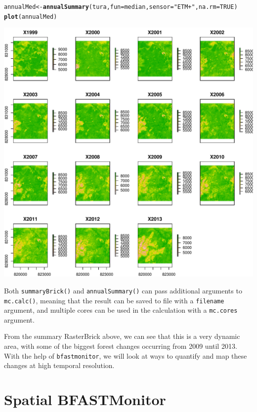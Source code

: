 \documentclass{article}\usepackage[]{graphicx}\usepackage[]{color}
\makeatletter
\def\maxwidth{ %
  \ifdim\Gin@nat@width>\linewidth
    \linewidth
  \else
    \Gin@nat@width
  \fi
}
\newcommand{\hlnum}[1]{\textcolor[rgb]{0.686,0.059,0.569}{#1}}%
\newcommand{\hlstr}[1]{\textcolor[rgb]{0.192,0.494,0.8}{#1}}%
\newcommand{\hlstd}[1]{\textcolor[rgb]{0.345,0.345,0.345}{#1}}%
\newcommand{\hlkwb}[1]{\textcolor[rgb]{0.69,0.353,0.396}{#1}}%
\newcommand{\hlkwc}[1]{\textcolor[rgb]{0.333,0.667,0.333}{#1}}%
\newcommand{\hlkwd}[1]{\textcolor[rgb]{0.737,0.353,0.396}{\textbf{#1}}}%
\newenvironment{kframe}{%
 \def\at@end@of@kframe{}%
 \ifinner\ifhmode%
  \def\at@end@of@kframe{\end{minipage}}%
  \begin{minipage}{\columnwidth}%
 \fi\fi%
 \def\FrameCommand##1{\hskip\@totalleftmargin \hskip-\fboxsep
 \colorbox{shadecolor}{##1}\hskip-\fboxsep
     \hskip-\linewidth \hskip-\@totalleftmargin \hskip\columnwidth}%
 \MakeFramed {\advance\hsize-\width
   \@totalleftmargin\z@ \linewidth\hsize
   \@setminipage}}%
 {\par\unskip\endMakeFramed%
 \at@end@of@kframe}
\newenvironment{knitrout}{}{} %
\def\code#1{\texttt{#1}}
\makeatother
\begin{document}
\begin{knitrout}
\color{fgcolor}\begin{kframe}
\begin{alltt}
\hlstd{annualMed} \hlkwb{<-} \hlkwd{annualSummary}\hlstd{(tura,} \hlkwc{fun} \hlstd{= median,} \hlkwc{sensor} \hlstd{=} \hlstr{"ETM+"}\hlstd{,} \hlkwc{na.rm} \hlstd{=} \hlnum{TRUE}\hlstd{)}
\hlkwd{plot}\hlstd{(annualMed)}
\end{alltt}
\end{kframe}
\includegraphics[width=\maxwidth]{figure/annualSummary-ETM} 

\end{knitrout}


Both \code{summaryBrick()} and \code{annualSummary()} can pass additional arguments to \code{mc.calc()}, meaning that the result can be saved to file with a \code{filename} argument, and multiple cores can be used in the calculation with a \code{mc.cores} argument.

From the summary RasterBrick above, we can see that this is a very dynamic area, with some of the biggest forest changes occurring from 2009 until 2013. With the help of \code{bfastmonitor}, we will look at ways to quantify and map these changes at high temporal resolution.

\section{Spatial BFASTMonitor}
\end{document}
